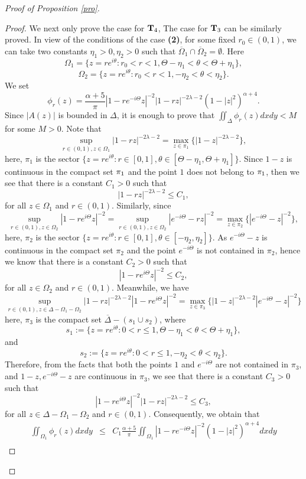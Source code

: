 \documentclass[10pt]{amsart}
\theoremstyle{definition}    %
\numberwithin{equation}{section}
\begin{document}
\begin{proof}[Proof of Proposition \ref{pro}]
\begin{proof}
We next only prove the case for ${\bf T}_{4}$, The case for ${\bf T}_{3}$ can be similarly proved.
In view of the conditions of the case {\bf (2)}, for some fixed $r_0\in (0,1)$, we can take two constants $\eta_1>0, \eta_2>0$ such that $\overline{\Omega}_1 \cap \overline{\Omega}_2=\emptyset$. 
Here $$\Omega_1=\{z=re^{i\theta}: r_0<r<1, \Theta-\eta_1<\theta<\Theta+\eta_1\}, $$
$$\Omega_2=\{z=re^{i\theta}: r_0<r<1, -\eta_2<\theta<\eta_2\}.$$
We set 
$$\phi_r(z)=\frac{\alpha+5}{\pi}|1-re^{-i\Theta}z|^{-2}|1-rz|^{-2\lambda-2}(1-|z|^2)^{\alpha+4}.$$
Since $|A(z)|$ is bounded in $\Delta$, it is enough to prove that $\iint_{\Delta}\phi_r(z)dxdy<M$ for some $M>0$.
Note that 
$$\sup_{r\in (0,1), z\in \Omega_1}|1-rz|^{-2\lambda-2}=\max_{z\in {\pi_1}}\{|1-z|^{-2\lambda-2}\},$$
here, $\pi_1$ is the sector $\{z=re^{i\theta}: r\in [0,1], \theta\in [\Theta-\eta_1, \Theta+\eta_1]\}$. Since $1-z$ is continuous in the compact set ${\bf \pi}_1$ and the point $1$ does not belong to ${\bf \pi}_1$, then we see that there is a constant $C_1>0$ such that
$$|1-rz|^{-2\lambda-2}\leq C_1,$$
for all $z\in \Omega_1$ and $r\in (0,1)$. Similarly, since 
$$\sup_{r\in (0,1), z\in \Omega_2}|1-re^{i\Theta}z|^{-2}=\sup_{r\in (0,1), z\in \Omega_2}|e^{-i\Theta}-rz|^{-2}=\max_{z\in {\pi_2}}\{|e^{-i\Theta}-z|^{-2}\},$$
here, $\pi_2$ is the sector $\{z=re^{i\theta}: r\in [0,1], \theta\in [-\eta_2, \eta_2]\}$. As $e^{-i\Theta}-z$ is continuous in the compact set $\pi_2$ and the point $e^{-i\Theta}$ is not contained in $\pi_2$, hence we know that there is a constant $C_2>0$ such that
$$|1-re^{i\Theta}z|^{-2}\leq C_2,$$
for all $z\in \Omega_2$ and $r\in (0,1)$. Meanwhile, we have
$$\sup_{r\in (0,1), z\in \Delta-\Omega_1-\Omega_2}|1-rz|^{-2\lambda-2}|1-re^{i\Theta}z|^{-2}=\max_{z\in \pi_3}\{|1-z|^{-2\lambda-2}|e^{-i\Theta}-z|^{-2}\}$$
here, $\pi_3$ is the compact set $\overline{\Delta}-(s_1 \cup s_2)$, where
$$s_1:=\{z=re^{i\theta}: 0<r\leq 1, \Theta-\eta_1<\theta<\Theta+\eta_1\},$$
and $$s_2:=\{z=re^{i\theta}: 0<r\leq 1, -\eta_2<\theta<\eta_2\}.$$
Therefore, from the facts that both the points $1$ and $e^{-i\Theta}$ are not contained in $\pi_3$, and $1-z, e^{-i\Theta}-z$ are continuous in $\pi_3$, we see that there is a constant $C_3>0$ such that
$$|1-re^{i\Theta}z|^{-2}|1-rz|^{-2\lambda-2}\leq C_3,$$
for all $z\in \Delta-\Omega_1-\Omega_2$ and $r\in (0,1)$. 
Consequently, we obtain that 
\begin{eqnarray}\label{phi-1}
\iint_{\Omega_1}\phi_r(z)dxdy& \leq & C_1\frac{\alpha+5}{\pi}\iint_{\Omega_1}|1-re^{-i\Theta}z|^{-2}(1-|z|^2)^{\alpha+4}dxdy  \\

\end{eqnarray}
\end{proof}
\end{proof}
\end{document}
